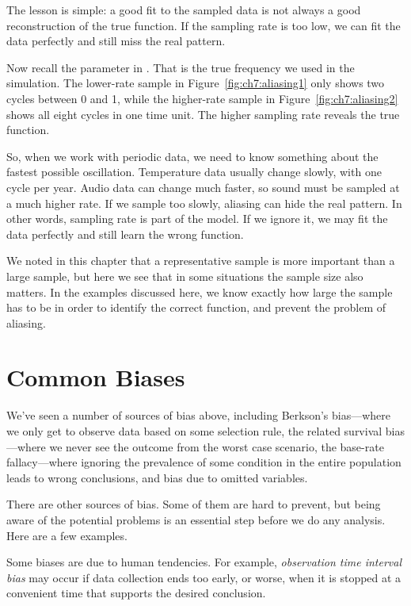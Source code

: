 The lesson is simple: a good fit to the sampled data is not always a good
reconstruction of the true function. If the sampling rate is too low, we can
fit the data perfectly and still miss the real pattern.

Now recall the parameter  in . That is the true frequency
we used in the simulation. The lower-rate sample in Figure~\ref{fig:ch7:aliasing1}
only shows two cycles between 0 and 1, while the higher-rate sample in
Figure~\ref{fig:ch7:aliasing2} shows all eight cycles in one time unit. The
higher sampling rate reveals the true function.

So, when we work with periodic data, we need to know something about the
fastest possible oscillation. Temperature data usually change slowly, with one
cycle per year. Audio data can change much faster, so sound must be sampled at
a much higher rate. If we sample too slowly, aliasing can hide the real
pattern.
In other words, sampling rate is part of the model. If we ignore it, we may
fit the data perfectly and still learn the wrong function.

We noted in this chapter that a representative sample is more
important than a large sample, but here we see that in some situations
the sample size also matters. In the examples discussed here,
we know exactly how large the sample has to be in order to identify
the correct function, and prevent the problem of aliasing.



\section{Common Biases}\label{sources-bias}
We've seen a number of sources of bias above, including Berkson's bias---where
we only get to observe data based on some selection rule,
the related survival bias---where we never see the outcome from the worst case 
scenario, the base-rate fallacy---where ignoring the prevalence of some
condition in the entire population leads to wrong conclusions, and
bias due to omitted variables.

There are other sources of bias. Some of them are hard to prevent,
but being aware of the potential problems is an essential step
before we do any analysis. Here are a few examples.

Some biases are due to human tendencies. For example, \emph{observation time
interval bias} may occur if data collection ends too early, or worse, when it is
stopped at a convenient time that supports the desired conclusion.

